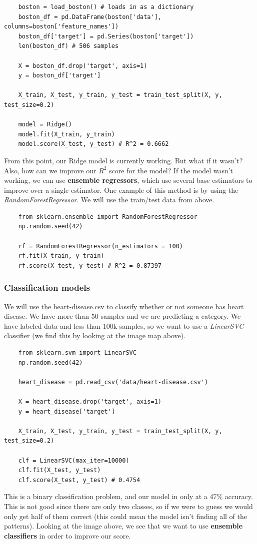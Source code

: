 \documentclass[11pt, a4paper]{article}
\begin{document}
\begin{spacing}{1.1}
\begin{lstlisting}
	boston = load_boston() # loads in as a dictionary
	boston_df = pd.DataFrame(boston['data'], columns=boston['feature_names'])
	boston_df['target'] = pd.Series(boston['target'])
	len(boston_df) # 506 samples
	
	X = boston_df.drop('target', axis=1)
	y = boston_df['target']
	
	X_train, X_test, y_train, y_test = train_test_split(X, y, test_size=0.2)
	
	model = Ridge()
	model.fit(X_train, y_train)
	model.score(X_test, y_test) # R^2 = 0.6662 \end{lstlisting} \vspace*{1mm}
	From this point, our Ridge model is currently working. But what if it wasn't? Also, how can we improve our $R^2$ score for the model? If the model wasn't working, we can use \textbf{ensemble regressors}, which use several base estimators to improve over a single estimator. One example of this method is by using the \textit{RandomForestRegressor}. We will use the train/test data from above.
	\begin{lstlisting}
	from sklearn.ensemble import RandomForestRegressor
	np.random.seed(42)
	
	rf = RandomForestRegressor(n_estimators = 100)
	rf.fit(X_train, y_train)
	rf.score(X_test, y_test) # R^2 = 0.87397 \end{lstlisting} \vspace*{1mm}
	
	\subsubsection{Classification models}
	We will use the heart-disease.csv to classify whether or not someone has heart disease. We have more than 50 samples and we are predicting a category. We have labeled data and less than 100k samples, so we want to use a \textit{LinearSVC} classifier (we find this by looking at the image map above).
	\begin{lstlisting}
	from sklearn.svm import LinearSVC
	np.random.seed(42)
	
	heart_disease = pd.read_csv('data/heart-disease.csv') 
	
	X = heart_disease.drop('target', axis=1)
	y = heart_disease['target']
	
	X_train, X_test, y_train, y_test = train_test_split(X, y, test_size=0.2)
	
	clf = LinearSVC(max_iter=10000)
	clf.fit(X_test, y_test)
	clf.score(X_test, y_test) # 0.4754 \end{lstlisting} \vspace*{1mm}
	This is a binary classification problem, and our model in only at a 47\% accuracy. This is not good since there are only two classes, so if we were to guess we would only get half of them correct (this could mean the model isn't finding all of the patterns). Looking at the image above, we see that we want to use \textbf{ensemble classifiers} in order to improve our score. \newpage
	

\end{spacing}
\end{document}
